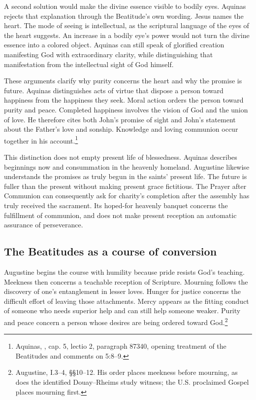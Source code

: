 A second solution would make the divine essence visible to bodily eyes. Aquinas rejects that explanation through the Beatitude's own wording. Jesus names the heart. The mode of seeing is intellectual, as the scriptural language of the eyes of the heart suggests. An increase in a bodily eye's power would not turn the divine essence into a colored object. Aquinas can still speak of glorified creation manifesting God with extraordinary clarity, while distinguishing that manifestation from the intellectual sight of God himself.

These arguments clarify why purity concerns the heart and why the promise is future. Aquinas distinguishes acts of virtue that dispose a person toward happiness from the happiness they seek. Moral action orders the person toward purity and peace. Completed happiness involves the vision of God and the union of love. He therefore cites both John's promise of sight and John's statement about the Father's love and sonship. Knowledge and loving communion occur together in his account.\footnote{Aquinas, , cap. 5, lectio 2, paragraph 87340, opening treatment of the Beatitudes and comments on 5:8--9.}

This distinction does not empty present life of blessedness. Aquinas describes beginnings now and consummation in the heavenly homeland. Augustine likewise understands the promises as truly begun in the saints' present life. The future is fuller than the present without making present grace fictitious. The Prayer after Communion can consequently ask for charity's completion after the assembly has truly received the sacrament. Its hoped-for heavenly banquet concerns the fulfillment of communion, and does not make present reception an automatic assurance of perseverance.

\subsection{The Beatitudes as a course of conversion}
Augustine begins the course with humility because pride resists God's teaching. Meekness then concerns a teachable reception of Scripture. Mourning follows the discovery of one's entanglement in lesser loves. Hunger for justice concerns the difficult effort of leaving those attachments. Mercy appears as the fitting conduct of someone who needs superior help and can still help someone weaker. Purity and peace concern a person whose desires are being ordered toward God.\footnote{Augustine,  I.3--4, §§10--12. His order places meekness before mourning, as does the identified Douay--Rheims study witness; the U.S. proclaimed Gospel places mourning first.}

